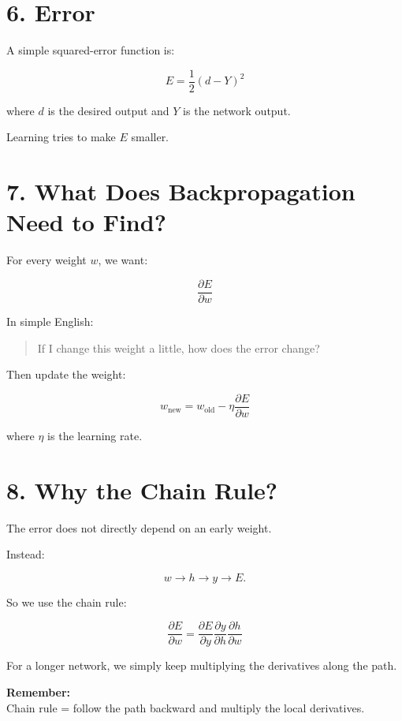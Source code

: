 \documentclass[11pt]{article}
\begin{document}
\section*{6. Error}

A simple squared-error function is:

\[
\boxed{E=\frac12(d-Y)^2}
\]

where $d$ is the desired output and $Y$ is the network output.

Learning tries to make $E$ smaller.

\section*{7. What Does Backpropagation Need to Find?}

For every weight $w$, we want:

\[
\boxed{\frac{\partial E}{\partial w}}
\]

In simple English:

\begin{quote}
If I change this weight a little, how does the error change?
\end{quote}

Then update the weight:

\[
\boxed{
w_{\text{new}}
=
w_{\text{old}}
-
\eta\frac{\partial E}{\partial w}
}
\]

where $\eta$ is the learning rate.

\section*{8. Why the Chain Rule?}

The error does not directly depend on an early weight.

Instead:

\[
w\rightarrow h\rightarrow y\rightarrow E.
\]

So we use the chain rule:

\[
\boxed{
\frac{\partial E}{\partial w}
=
\frac{\partial E}{\partial y}
\frac{\partial y}{\partial h}
\frac{\partial h}{\partial w}
}
\]

For a longer network, we simply keep multiplying the derivatives along the path.

\begin{tcolorbox}
\textbf{Remember:}\\
Chain rule = follow the path backward and multiply the local derivatives.
\end{tcolorbox}
\end{document}
